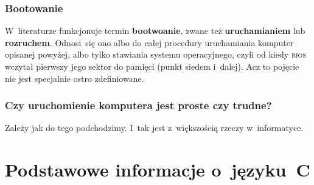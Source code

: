 \documentclass[10pt,t]{beamer}
\begin{document}
\begin{frame}
  \frametitle{Bootowanie}


  W~literaturze funkcjonuje termin \textbf{bootwoanie}, zwane też
  \textbf{uruchamianiem} lub \textbf{rozruchem}. Odnosi~się ono albo do
  całej procedury uruchamiania komputer opisanej powyżej, albo tylko
  stawiania systemu operacyjnego, czyli od kiedy \textsc{bios} wczytał
  pierwszy jego sektor do pamięci (punkt siedem i~dalej). Acz to pojęcie
  nie jest specjalnie ostro zdefiniowane.

\end{frame}





\begin{frame}
  \frametitle{Czy uruchomienie komputera jest proste czy trudne?}


  Zależy jak do tego podchodzimy. I~tak jest z~większością rzeczy
  w~informatyce.

\end{frame}










\section{Podstawowe informacje o~języku~C}
\end{document}
